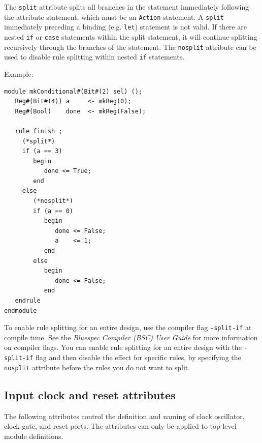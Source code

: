 \documentclass[twoside,letterpaper]{article}
\newcommand{\BSCUserGuideFullName}{\emph{Bluespec Compiler (BSC) User Guide}}
\newcommand{\te}[1]{\texttt{#1}}
\begin{document}
 The \te{split} attribute splits all branches in the statement
immediately  following
the attribute statement, which must be an \te{Action} statement. A
\te{split}  immediately preceding a binding (e.g. \te{let})
statement is not valid. If
there are  nested \te{if} or \te{case} statements
within the split statement, it will continue splitting recursively through the
branches of the statement.  The \te{nosplit} attribute can be used to
disable rule splitting within nested \te{if} statements.


Example:
\begin{verbatim}
module mkConditional#(Bit#(2) sel) ();
   Reg#(Bit#(4)) a     <- mkReg(0);
   Reg#(Bool)    done  <- mkReg(False);

   rule finish ;
     (*split*)
     if (a == 3)
        begin   
           done <= True;
        end
     else
        (*nosplit*)
        if (a == 0)
           begin
              done <= False;
              a    <= 1;
           end
        else
           begin
              done <= False;
           end
   endrule
endmodule
\end{verbatim}

To enable rule splitting for an entire design, use the compiler
flag \te{-split-if} at compile time.  See the {\BSCUserGuideFullName} for
more information on compiler flags.  You can enable rule splitting for
an entire design with the \te{-split-if} flag and then disable the
effect for specific rules, by specifying the \te{nosplit} attribute
before the rules you do not want to split.


\subsection{Input clock and reset attributes}

The following attributes control the definition and naming of clock
oscillator, clock gate, and reset ports. The attributes can only be applied
to top-level module definitions.
\end{document}
